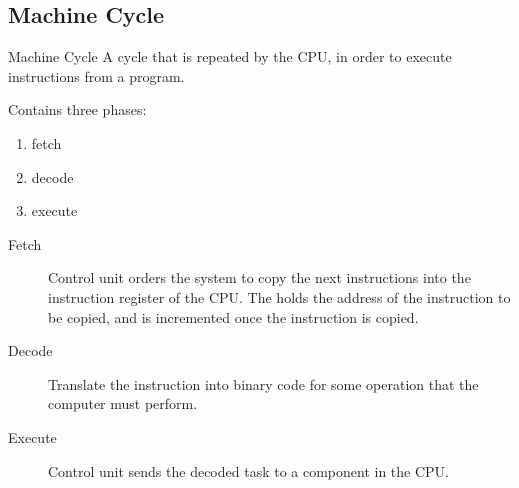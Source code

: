 \documentclass[\main/notes.tex]{subfiles}
\begin{document}
				\subsection{Machine Cycle}
					\begin{definition}{Machine Cycle}
						A cycle that is repeated by the CPU, in order to execute instructions from a program.
					\end{definition}
					Contains three phases:
					\begin{enumerate}[nosep]
						\item fetch
						\item decode
						\item execute
					\end{enumerate}
					\begin{description}
						\item[Fetch] Control unit orders the system to copy the next instructions into the instruction register of the CPU. The  holds the address of the instruction to be copied, and is incremented once the instruction is copied.
						\item[Decode] Translate the instruction into binary code for some operation that the computer must perform.
						\item[Execute] Control unit sends the decoded task to a component in the CPU.  
					\end{description}
				\pagebreak
\end{document}
